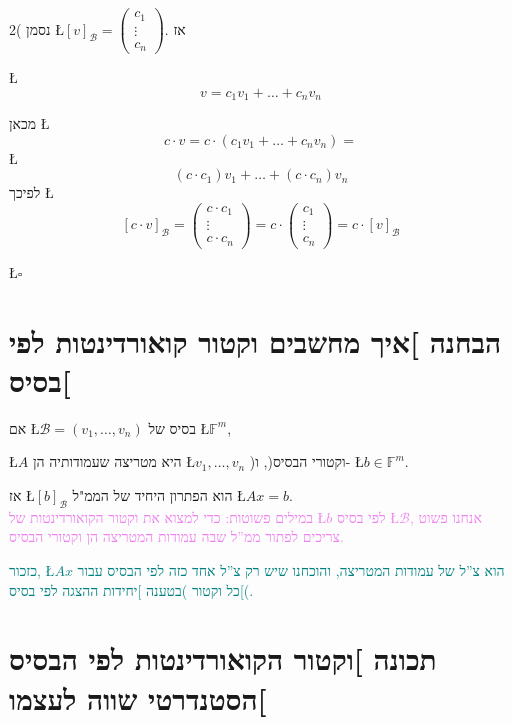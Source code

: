 \documentclass[english,hebrew]{article}
\begin{document}
2( נסמן \L{$[v]_{\mathcal{B}}=\begin{pmatrix}c_{1}\\
\vdots\\
c_{n}
\end{pmatrix}$}. אז

\L{%
\[
v=c_{1}v_{1}+\dots+c_{n}v_{n}
\]
}%

מכאן \L{%
\[
c\cdot v=c\cdot(c_{1}v_{1}+\dots+c_{n}v_{n})=
\]
}%
\L{%
\[
(c\cdot c_{1})v_{1}+\dots+(c\cdot c_{n})v_{n}
\]
}%
לפיכך \L{%
\[
[c\cdot v]_{\mathcal{B}}=\begin{pmatrix}c\cdot c_{1}\\
\vdots\\
c\cdot c_{n}
\end{pmatrix}=c\cdot\begin{pmatrix}c_{1}\\
\vdots\\
c_{n}
\end{pmatrix}=c\cdot[v]_{\mathcal{B}}
\]
}%

\begin{flushright}
\L{$\square$}
\par\end{flushright}

\section{הבחנה {]}איך מחשבים וקטור קואורדינטות לפי בסיס{[}}

אם \L{$\mathcal{B}=(v_{1},\dots,v_{n})$} בסיס של \L{$\mathbb{F}^{m}$},

\L{$A$} היא מטריצה שעמודותיה הן \L{$v_{1},\dots,v_{n}$} )וקטורי
הבסיס(, ו- \L{$b\in\mathbb{F}^{m}$}.

אז \L{$[b]_{\mathcal{B}}$} הוא הפתרון היחיד של הממ"ל \L{$Ax=b$}.\\

\textcolor{violet}{במילים פשוטות: כדי למצוא את וקטור הקואורדינטות
של \L{$b$} לפי בסיס \L{$\mathcal{B}$}, אנחנו פשוט צריכים לפתור ממ\textquotedblright ל
שבה עמודות המטריצה הן וקטורי הבסיס.}

\textcolor{teal}{כזכור, \L{$Ax$} הוא צ\textquotedblright ל של עמודות
המטריצה, והוכחנו שיש רק צ\textquotedblright ל אחד כזה לפי הבסיס עבור
כל וקטור )בטענה {]}יחידות ההצגה לפי בסיס{[}(.}

\section{תכונה {]}וקטור הקואורדינטות לפי הבסיס הסטנדרטי שווה לעצמו{[}}
\end{document}
